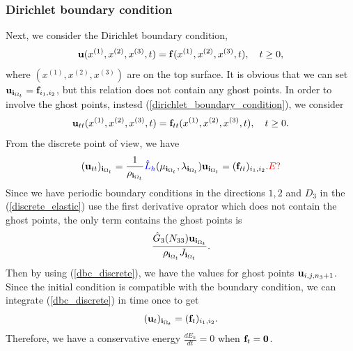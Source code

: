 \documentclass[a4paper]{article}
\begin{document}
\subsubsection{Dirichlet boundary condition}
Next, we consider the Dirichlet boundary condition, 
\begin{equation}\label{dirichlet_boundary_condition}
{\bf u}(x^{(1)},x^{(2)},x^{(3)},t) = {\bf f}(x^{(1)},x^{(2)},x^{(3)},t),  \ \ \ t \geq 0,
\end{equation}
where $(x^{(1)},x^{(2)},x^{(3)})$ are on the top surface. It is obvious that we can set ${\bf u}_{{\bf i}_{\Omega_t}} = {\bf f}_{i_1,i_2}$, but this relation does not contain any ghost points. In order to involve the ghost points, instesd (\ref{dirichlet_boundary_condition}), we consider
\begin{equation}
{\bf u}_{tt}(x^{(1)},x^{(2)},x^{(3)},t) = {\bf f}_{tt}(x^{(1)},x^{(2)},x^{(3)},t),  \ \ \ t \geq 0.
\end{equation}
From the discrete point of view, we have
\begin{equation}\label{dbc_discrete}
({\bf u}_{tt})_{{\bf i}_{\Omega_t}}=\frac{1}{\rho_{{\bf i}_{\Omega_t}}} {\color{blue}\hat{L}_h}(\mu_{{\bf i}_{\Omega_t}},\lambda_{{\bf i}_{\Omega_t}}){\bf u}_{{\bf i}_{\Omega_t}} = ({\bf f}_{tt})_{i_1,i_2}. {\color{red}E?}
\end{equation}
Since we have periodic boundary conditions in the directions $1,2$ and $D_3$ in the (\ref{discrete_elastic}) use the first derivative oprator which does not contain the ghost points, the only term contains the ghost points is 
\[\frac{\hat{G}_3(N_{33}){\bf u}_{{\bf i}_{\Omega_t}}}{\rho_{{\bf i}_{\Omega_t}}J_{{\bf i}_{\Omega_t}}}.\]
Then by using (\ref{dbc_discrete}), we have the values for ghost points ${\bf u}_{i,j,n_3+1}$. Since the initial condition is compatible with the boundary condition, we can integrate (\ref{dbc_discrete}) in time once to get
\[({\bf u}_t)_{{\bf i}_{\Omega_t}} = ({\bf f}_t)_{i_1,i_2}.\]
Therefore, we have a conservative energy $\frac{dE_h}{dt} = 0$ when ${\bf f}_t = {\bf 0}$.
\end{document}
